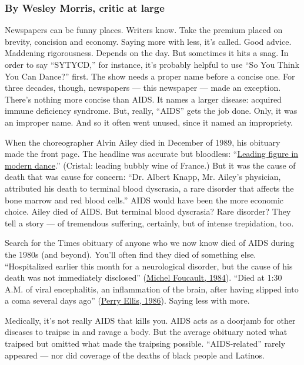 \hypertarget{by-wesley-morris-critic-at-large}{%
\subsubsection{By Wesley Morris, critic at
large}\label{by-wesley-morris-critic-at-large}}

Newspapers can be funny places. Writers know. Take the premium placed on
brevity, concision and economy. Saying more with less, it's called. Good
advice. Maddening rigorousness. Depends on the day. But sometimes it
hits a snag. In order to say ``SYTYCD,'' for instance, it's probably
helpful to use ``So You Think You Can Dance?'' first. The show needs a
proper name before a concise one. For three decades, though, newspapers
--- this newspaper --- made an exception. There's nothing more concise
than AIDS. It names a larger disease: acquired immune deficiency
syndrome. But, really, ``AIDS'' gets the job done. Only, it was an
improper name. And so it often went unused, since it named an
impropriety.

When the choreographer Alvin Ailey died in December of 1989, his
obituary made the front page. The headline was accurate but bloodless:
``\href{https://www.nytimes.com/1989/12/02/obituaries/alvin-ailey-a-leading-figure-in-modern-dance-dies-at-58.html}{Leading
figure in modern dance}.'' (Cristal: leading bubbly wine of France.) But
it was the cause of death that was cause for concern: ``Dr. Albert
Knapp, Mr. Ailey's physician, attributed his death to terminal blood
dyscrasia, a rare disorder that affects the bone marrow and red blood
cells.'' AIDS would have been the more economic choice. Ailey died of
AIDS. But terminal blood dyscrasia? Rare disorder? They tell a story ---
of tremendous suffering, certainly, but of intense trepidation, too.

Search for the Times obituary of anyone who we now know died of AIDS
during the 1980s (and beyond). You'll often find they died of something
else. ``Hospitalized earlier this month for a neurological disorder, but
the cause of his death was not immediately disclosed''
(\href{https://archive.nytimes.com/www.nytimes.com/books/00/12/17/specials/foucault-obit.html?_r=1}{Michel
Foucault, 1984}). ``Died at 1:30 A.M. of viral encephalitis, an
inflammation of the brain, after having slipped into a coma several days
ago''
(\href{https://www.nytimes.com/1986/05/31/obituaries/perry-ellis-fashion-designer-dead.html}{Perry
Ellis, 1986}). Saying less with more.

Medically, it's not really AIDS that kills you. AIDS acts as a doorjamb
for other diseases to traipse in and ravage a body. But the average
obituary noted what traipsed but omitted what made the traipsing
possible. ``AIDS-related'' rarely appeared --- nor did coverage of the
deaths of black people and Latinos.

